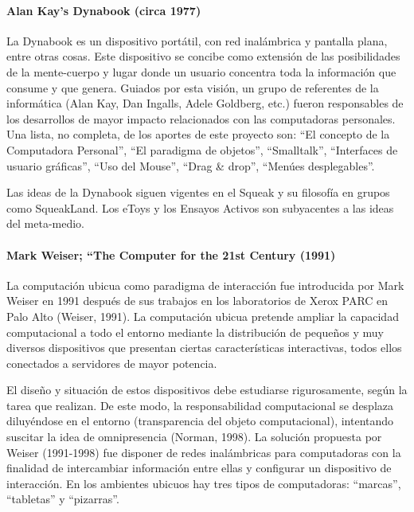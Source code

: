 \paragraph {Alan Kay's Dynabook (circa 1977)} 

La Dynabook es un dispositivo portátil, con red inalámbrica y pantalla plana,
entre otras
cosas. Este dispositivo se concibe
como extensión de las posibilidades de la mente-cuerpo y lugar donde un usuario
concentra toda la información que consume y que genera.
Guiados por esta visión, un grupo de referentes de la informática (Alan Kay, Dan
Ingalls, Adele Goldberg, etc.) fueron responsables de los desarrollos de mayor
impacto
relacionados con las computadoras personales. Una lista, no completa, de los
aportes de
este proyecto son: “El concepto de la Computadora Personal”, “El paradigma de
objetos”, “Smalltalk”, “Interfaces de usuario gráficas”, “Uso del Mouse”, “Drag
&
drop”, “Menúes desplegables”.

Las ideas de la Dynabook siguen vigentes en el Squeak y su filosofía en grupos
como
SqueakLand. Los eToys y los Ensayos Activos son subyacentes a las
ideas
del meta-medio.


\paragraph {Mark Weiser; “The Computer for the 21st Century (1991)}  

La computación ubicua como paradigma de interacción fue introducida por Mark
Weiser en 1991 después de sus trabajos en los laboratorios de Xerox PARC en Palo
Alto (Weiser, 1991). La computación ubicua pretende ampliar la capacidad
computacional a todo el entorno mediante la distribución de pequeños y muy
diversos
dispositivos que presentan ciertas características interactivas, todos ellos
conectados a
servidores de mayor potencia.


El diseño y situación de estos dispositivos debe estudiarse rigurosamente, según
la tarea
que realizan. De este modo, la responsabilidad computacional se desplaza
diluyéndose
en el entorno (transparencia del objeto computacional), intentando suscitar la
idea de
omnipresencia (Norman, 1998). La solución propuesta por Weiser (1991-1998) fue
disponer de redes inalámbricas para computadoras con la finalidad de
intercambiar
información entre ellas y configurar un dispositivo de interacción. En los
ambientes
ubicuos hay tres tipos de computadoras: “marcas”, “tabletas” y “pizarras”.

